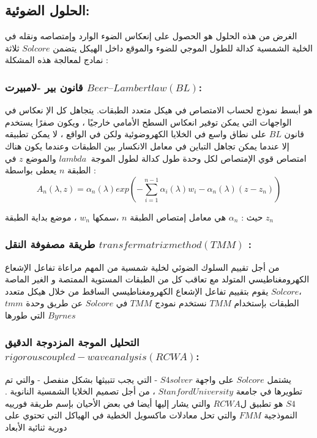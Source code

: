\subsection{الحلول الضوئية:}
الغرض من هذه الحلول هو الحصول على إنعكاس الضوء الوارد وإمتصاصه ونقله في الخلية الشمسية كدالة للطول الموجي للضوء والموقع داخل الهيكل 
يتضمن $ Solcore $ ثلاثة نمادج لمعالجة هذه المشكلة :
\subsubsection{قانون بير -لامبيرت $ Beer–Lambert law (BL) $:}
هو أبسط نموذج لحساب الامتصاص في هيكل متعدد الطبقات. يتجاهل كل الإ نعكاس في الواجهات التي يمكن توفير انعكاس السطح الأمامي خارجيًا ، ويكون صفرًا 
يستخدم قانون $ BL $ على نطاق واسع في الخلايا الكهروضوئية ولكن في الواقع ، لا يمكن تطبيقه إلا عندما يمكن تجاهل التباين في معامل الانكسار بين الطبقات وعندما يكون هناك امتصاص قوي
الإمتصاص لكل وحدة طول كدالة لطول الموجة $ lambda\  $ والموضع $ z $ في الطبقة $ n $ يعطى بواسطة : 
\begin{equation}
	A_n(\lambda,z)=\alpha_n(\lambda)exp(-\sum_{i=1}^{ n-1}\alpha_i(\lambda)w_i-\alpha_ n ( \lambda )(z-z_n))
\end{equation}

حيث : $\alpha_n$ هي معامل إمتصاص الطبقة $ n $  ،سمكها  $ w_n $ ، موضع بداية الطبقة $  z_n $


\subsubsection{ طريقة مصفوفة النقل $ transfer matrix method (TMM) $ :}
من أجل تقييم  السلوك الضوئي لخلية شمسية من المهم مراعاة تفاعل الإشعاع الكهرومغناطيسي المتولد مع تعاقب كل من الطبقات المستوية  الممتصة و الغير الماصة ،$ Solcore $  يقوم بتقييم تفاعل الإشعاع الكهرومغناطيسي الساقط من خلال هيكل متعدد الطبقات بإستخدام $ TMM $ 
نستخدم نمودج $ TMM $  في $ Solcore $ عن طريق وحدة $ tmm $ التي طورها $ Byrnes $   

\subsubsection{التحليل الموجة المزدوجة الدقيق$  rigorous coupled-wave analysis (RCWA) $:}
يشتمل $ Solcore $ على واجهة $ S4 solver $ - التي يجب تتبيثها بشكل منفصل - والتي تم تطويرها في جامعة $ Stanford University $ ، من أجل تصميم الخلايا الشمسية النانوية . $ S4 $ هو تطبيق ل$ RCWA $ والتي يشار إليها أيضا في بعض الأحيان بإسم طريقة فورييه النموذجية $ FMM $  والتي تحل معادلات ماكسويل الخطية  في الهياكل التي تحتوي على دورية ثنائية الأبعاد 

